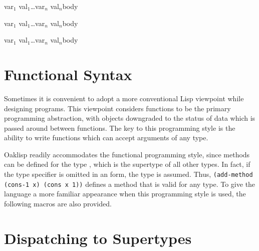 {\lpar\lpar var$_1$ val$_1$\rpar\ldots var$_n$ val$_n$\rpar \dt body}

{\lpar\lpar var$_1$ val$_1$\rpar\ldots var$_n$ val$_n$\rpar \dt body}

{\lpar\lpar var$_1$ val$_1$\rpar\ldots\lpar var$_n$ val$_n$\rpar\rpar \dt body}


\section{Functional Syntax}

Sometimes it is convenient to adopt a more conventional Lisp
viewpoint while designing programs.  This viewpoint considers functions
to be the primary programming abstraction, with objects downgraded to
the status of data which is passed around between functions. The key
to this programming style is the ability to write functions which can accept
arguments of any type.

Oaklisp readily accommodates the functional programming style, since
methods can be defined for the type , which is the
supertype of all other types.  In fact, if the type specifier is
omitted in an  form, the type  is assumed.
Thus, \texttt{(add-method (\mbox{cons-1} x) (cons x 1))} defines a method that
is valid for any type.  To give the language a more familiar
appearance when this programming style is used, the following macros
are also provided.




\section{Dispatching to Supertypes}

